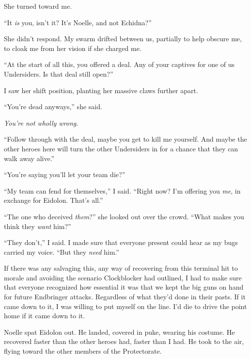 She turned toward me.



``It \emph{is} you, isn't it?  It's Noelle, and not Echidna?''



She didn't respond.  My swarm drifted between us, partially to help obscure me, to cloak me from her vision if she charged me.



``At the start of all this, you offered a deal.  Any of your captives for one of us Undersiders.  Is that deal still open?''



I saw her shift position, planting her massive claws further apart.



``You're dead anyways,'' she said.



\emph{You're not wholly wrong}.



``Follow through with the deal, maybe you get to kill me yourself.  And maybe the other heroes here will turn the other Undersiders in for a chance that they can walk away alive.''



``You're saying you'll let your team die?''



``My team can fend for themselves,'' I said.  ``Right now?  I'm offering you \emph{me}, in exchange for Eidolon.  That's all.''



``The one who deceived \emph{them}?'' she looked out over the crowd.  ``What makes you think they \emph{want} him?''



``They don't,'' I said.  I made sure that everyone present could hear as my bugs carried my voice.  ``But they \emph{need} him.''



If there was any salvaging this, any way of recovering from this terminal hit to morale and avoiding the scenario Clockblocker had outlined, I had to make sure that everyone recognized how essential it was that we kept the big guns on hand for future Endbringer attacks.  Regardless of what they'd done in their pasts.  If it came down to it, I was willing to put myself on the line.  I'd die to drive the point home if it came down to it.



Noelle spat Eidolon out.  He landed, covered in puke, wearing his costume.  He recovered faster than the other heroes had, faster than I had.  He took to the air, flying toward the other members of the Protectorate.



